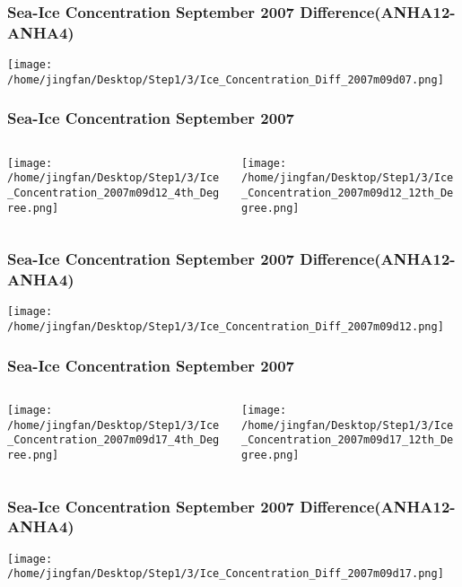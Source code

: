 \documentclass{beamer}
\begin{document}
\begin{frame}
\frametitle{Sea-Ice Concentration September 2007 Difference(ANHA12-ANHA4)}

\texttt{[image: /home/jingfan/Desktop/Step1/3/Ice\_Concentration\_Diff\_2007m09d07.png]}

\end{frame}

\begin{frame}
\frametitle{Sea-Ice Concentration September 2007}

\begin{columns}
\begin{column}[t]{0.5\linewidth}
\centering
\texttt{[image: /home/jingfan/Desktop/Step1/3/Ice\_Concentration\_2007m09d12\_4th\_Degree.png]}
\end{column}
\begin{column}[t]{0.5\linewidth}
\centering
\texttt{[image: /home/jingfan/Desktop/Step1/3/Ice\_Concentration\_2007m09d12\_12th\_Degree.png]}
\end{column}
\end{columns}

\end{frame}

\begin{frame}
\frametitle{Sea-Ice Concentration September 2007 Difference(ANHA12-ANHA4)}

\texttt{[image: /home/jingfan/Desktop/Step1/3/Ice\_Concentration\_Diff\_2007m09d12.png]}

\end{frame}

\begin{frame}
\frametitle{Sea-Ice Concentration September 2007}

\begin{columns}
\begin{column}[t]{0.5\linewidth}
\centering
\texttt{[image: /home/jingfan/Desktop/Step1/3/Ice\_Concentration\_2007m09d17\_4th\_Degree.png]}
\end{column}
\begin{column}[t]{0.5\linewidth}
\centering
\texttt{[image: /home/jingfan/Desktop/Step1/3/Ice\_Concentration\_2007m09d17\_12th\_Degree.png]}
\end{column}
\end{columns}

\end{frame}

\begin{frame}
\frametitle{Sea-Ice Concentration September 2007 Difference(ANHA12-ANHA4)}

\texttt{[image: /home/jingfan/Desktop/Step1/3/Ice\_Concentration\_Diff\_2007m09d17.png]}

\end{frame}
\end{document}
